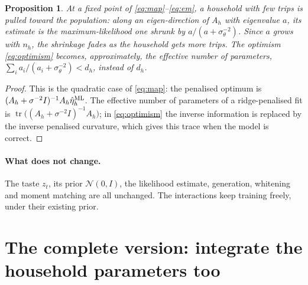 \documentclass[11pt]{article}
\newtheorem{proposition}{Proposition}
\theoremstyle{remark}\newtheorem{remark}{Remark}
\newcommand{\N}{\mathcal{N}}
\begin{document}
\begin{proposition}\label{prop:shrink}
At a fixed point of \eqref{eq:map}--\eqref{eq:em}, a household with few trips is pulled toward the
population: along an eigen-direction of $A_h$ with eigenvalue $a$, its estimate is the
maximum-likelihood one shrunk by $a/(a+\sigma_\theta^{-2})$. Since $a$ grows with $n_h$, the shrinkage
fades as the household gets more trips. The optimism \eqref{eq:optimism} becomes, approximately, the effective
number of parameters, $\sum_i a_i/(a_i+\sigma_\theta^{-2})<d_h$, instead of $d_h$.
\end{proposition}
\begin{proof}
This is the quadratic case of \eqref{eq:map}: the penalised optimum is
$(A_h+\sigma^{-2}I)^{-1}A_h\hat\eta_h^{\rm ML}$. The effective number of parameters of a
ridge-penalised fit is $\operatorname{tr}\big((A_h+\sigma^{-2}I)^{-1}A_h\big)$; in \eqref{eq:optimism}
the inverse information is replaced by the inverse penalised curvature, which gives this trace
when the model is correct.
\end{proof}

\paragraph{What does not change.} The taste $z_t$, its prior $\N(0,I)$, the likelihood estimate,
generation, whitening and moment matching are all unchanged. The interactions keep training freely,
under their existing prior.

\section{The complete version: integrate the household parameters too}
\end{document}
